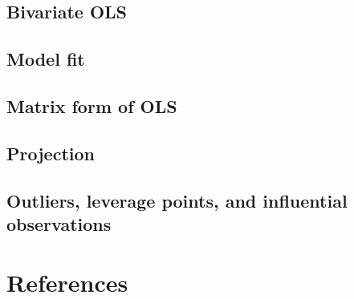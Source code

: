 \documentclass[
  letterpaper,
  DIV=11,
  numbers=noendperiod]{scrreprt}
\newlength{\cslhangindent}
\newlength{\cslentryspacingunit} %
\newenvironment{CSLReferences}[2] %
 {%
  \setlength{\parindent}{0pt}
  \ifodd #1
  \let\oldpar\par
  \def\par{\hangindent=\cslhangindent\oldpar}
  \fi
  \setlength{\parskip}{#2\cslentryspacingunit}
 }%
 {}
\theoremstyle{definition}
\theoremstyle{plain}
\theoremstyle{definition}
\theoremstyle{remark}
\begin{document}
\hypertarget{bivariate-ols}{%
\section{Bivariate OLS}\label{bivariate-ols}}

\hypertarget{model-fit}{%
\section{Model fit}\label{model-fit}}

\hypertarget{matrix-form-of-ols}{%
\section{Matrix form of OLS}\label{matrix-form-of-ols}}

\hypertarget{projection}{%
\section{Projection}\label{projection}}

\hypertarget{outliers-leverage-points-and-influential-observations}{%
\section{Outliers, leverage points, and influential
observations}\label{outliers-leverage-points-and-influential-observations}}


\hypertarget{references}{%
\chapter*{References}\label{references}}


\hypertarget{refs}{}
\begin{CSLReferences}{0}{0}
\end{CSLReferences}
\end{document}
